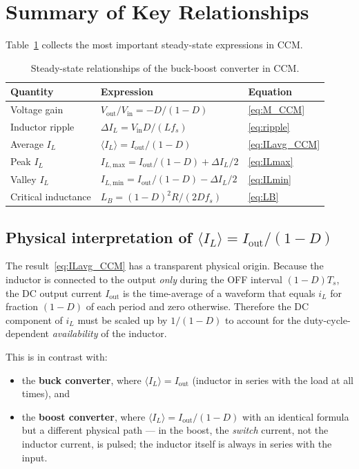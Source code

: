 \documentclass[12pt,a4paper]{article}
\newcommand{\Vin}{V_{\mathrm{in}}}
\newcommand{\Vout}{V_{\mathrm{out}}}
\newcommand{\Iout}{I_{\mathrm{out}}}
\newcommand{\ILmax}{I_{L,\mathrm{max}}}
\newcommand{\ILmin}{I_{L,\mathrm{min}}}
\newcommand{\ILavg}{\langle I_L \rangle}
\newcommand{\DeltaIL}{\Delta I_L}
\newcommand{\Ts}{T_s}
\newcommand{\fs}{f_s}
\begin{document}
\section{Summary of Key Relationships}
\label{sec:summary}

Table~\ref{tab:summary} collects the most important steady-state
expressions in CCM.

\begin{table}[H]
  \centering
  \caption{Steady-state relationships of the buck-boost converter in CCM.}
  \label{tab:summary}
  \renewcommand{\arraystretch}{1.5}
  \begin{tabular}{@{} l l l @{}}
    \toprule
    \textbf{Quantity} & \textbf{Expression} & \textbf{Equation} \\
    \midrule
    Voltage gain        & $\Vout/\Vin = -D/(1-D)$              & \eqref{eq:M_CCM}    \\
    Inductor ripple     & $\DeltaIL = \Vin D / (L\fs)$         & \eqref{eq:ripple}   \\
    Average $I_L$       & $\ILavg = \Iout/(1-D)$               & \eqref{eq:ILavg_CCM}\\
    Peak $I_L$          & $\ILmax = \Iout/(1-D)+\DeltaIL/2$    & \eqref{eq:ILmax}    \\
    Valley $I_L$        & $\ILmin = \Iout/(1-D)-\DeltaIL/2$    & \eqref{eq:ILmin}    \\
    Critical inductance & $L_B = (1-D)^2 R/(2D\fs)$           & \eqref{eq:LB}       \\
    \bottomrule
  \end{tabular}
\end{table}

\subsection*{Physical interpretation of $\ILavg = \Iout/(1-D)$}

The result~\eqref{eq:ILavg_CCM} has a transparent physical origin.
Because the inductor is connected to the output \emph{only} during the
OFF interval $(1-D)\Ts$, the DC output current $\Iout$ is the time-average
of a waveform that equals $i_L$ for fraction $(1-D)$ of each period and
zero otherwise.
Therefore the DC component of $i_L$ must be scaled up by $1/(1-D)$ to
account for the duty-cycle-dependent \emph{availability} of the inductor.

This is in contrast with:
\begin{itemize}
  \item the \textbf{buck converter}, where $\ILavg = \Iout$ (inductor in
        series with the load at all times), and
  \item the \textbf{boost converter}, where $\ILavg = \Iout/(1-D)$
        with an identical formula but a different physical path — in the
        boost, the \emph{switch} current, not the inductor current, is
        pulsed; the inductor itself is always in series with the input.
\end{itemize}
\end{document}
